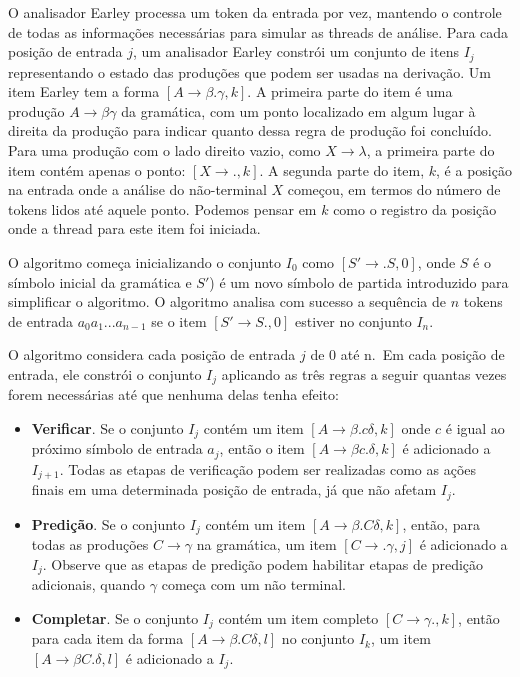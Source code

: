O analisador Earley processa um token da entrada por vez, mantendo o
controle de todas as informações necessárias para simular as threads
de análise. Para cada posição de entrada \(j\), um analisador Earley
constrói um conjunto de itens \(I_j\) representando o estado das
produções que podem ser usadas na derivação. Um item Earley tem a
forma \([A \to \beta .\gamma, k]\). A primeira parte do item é uma
produção \(A \to \beta \gamma\) da gramática, com um ponto localizado
em algum lugar à direita da produção para indicar quanto dessa regra
de produção foi concluído. Para uma produção com o lado direito
vazio, como \(X \to \lambda\), a primeira parte do item contém apenas
o ponto: \([X \to ., k]\). A segunda parte do item, \(k\), é a posição
na entrada onde a análise do não-terminal $X$ começou, em termos do
número de tokens lidos até aquele ponto. Podemos pensar em \(k\) como
o registro da posição onde a thread para este item foi iniciada.

O algoritmo começa inicializando o conjunto \(I_0\) como \([S' \to .
S, 0]\), onde \(S\) é o símbolo inicial da gramática e \(S'\)) é um
novo símbolo de partida introduzido para simplificar o algoritmo. O
algoritmo analisa com sucesso a sequência de \(n\) tokens de entrada
\(a_0 a_1 ... a_{n - 1}\) se o item \([S' \to S ., 0]\) estiver no
conjunto \(I_n\).

O algoritmo considera cada posição de entrada \(j\) de 0 até n.~Em
cada posição de entrada, ele constrói o conjunto \(I_j\) aplicando as
três regras a seguir quantas vezes forem necessárias até que nenhuma
delas tenha efeito:

\begin{itemize}
\item \textbf{Verificar}. Se o conjunto \(I_j\) contém um item \([A \to
  \beta . c\delta, k]\) onde \(c\) é igual ao próximo símbolo de
  entrada \(a_j\), então o item \([A \to \beta c . \delta, k]\) é
  adicionado a \(I_{j+1}\). Todas as etapas de verificação podem ser
  realizadas como as ações finais em uma determinada posição de
  entrada, já que não afetam \(I_j\).
\item \textbf{Predição}. Se o conjunto \(I_j\) contém um item \([A \to
  \beta . C\delta, k]\), então, para todas as produções \(C\to
  \gamma\) na gramática, um item \([C\to.\gamma, j]\) é adicionado a
  \(I_j\). Observe que as etapas de predição podem habilitar etapas
  de predição adicionais, quando \(\gamma\) começa com um não terminal.
\item \textbf{Completar}. Se o conjunto \(I_j\) contém um item completo
  \([C\to \gamma . , k]\), então para cada item da forma \([A\to\beta
  . C\delta, l]\) no conjunto \(I_k\), um item \([A\to \beta C .
  \delta, l]\) é adicionado a \(I_j\).
\end{itemize}

